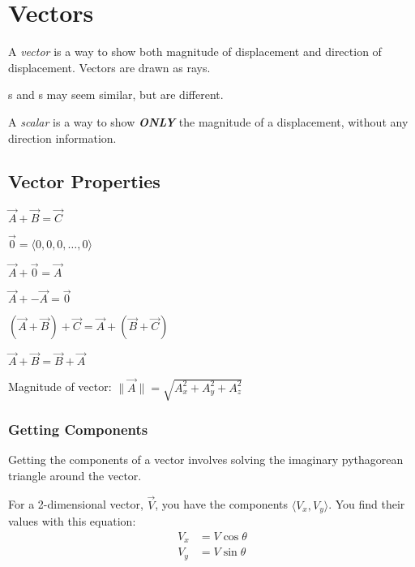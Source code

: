 \section{Vectors} \label{sec:Vectors}
\begin{definition}[Vector] \label{def:Vector}
  A \emph{vector} is a way to show both magnitude of displacement and direction of displacement.
  Vectors are drawn as rays.
  \begin{remark}
    s and s may seem similar, but are different.
  \end{remark}
\end{definition}

\begin{definition}[Scalar] \label{def:Scalar}
  A \emph{scalar} is a way to show \emph{\textbf{ONLY}} the magnitude of a displacement, without any direction information.
\end{definition}

\subsection{Vector Properties} \label{subsec:Vector Properties}
\begin{propertylist}
  \item $\vec{A} + \vec{B} = \vec{C}$
  \item $\vec{0} = \langle 0, 0, 0, \ldots, 0 \rangle$
  \item $\vec{A} + \vec{0} = \vec{A}$
  \item $\vec{A} + -\vec{A} = \vec{0}$
  \item $\left( \vec{A} + \vec{B} \right) + \vec{C} = \vec{A} + \left( \vec{B} + \vec{C} \right)$
  \item $\vec{A} + \vec{B} = \vec{B} + \vec{A}$
  \item Magnitude of vector: $\lVert \vec{A} \rVert = \sqrt{A_{x}^{2} + A_{y}^{2} + A_{z}^{2}}$
\end{propertylist}
  
\subsubsection{Getting Components} \label{subsubsec:Vector Components}
Getting the components of a vector involves solving the imaginary pythagorean triangle around the vector.

For a 2-dimensional vector, $\vec{V}$, you have the components $\langle V_{x}, V_{y} \rangle$.
You find their values with this equation:
\begin{equation} \label{eq:Vector Components}
  \begin{aligned}
    V_{x} &= V \cos \theta \\
    V_{y} &= V \sin \theta
  \end{aligned}
\end{equation}

